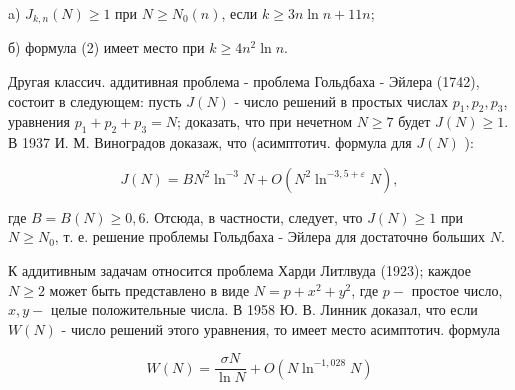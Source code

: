 \documentclass[10pt]{article}
\begin{document}
a) $J_{k, n}(N) \geqslant 1$ при $N \geqslant N_{0}(n)$, если $k \geqslant 3 n \ln n+11 n$;



б) формула (2) имеет место при $k \geqslant 4 n^{2} \ln n$.



Другая классич. аддитивная проблема - проблема Гольдбаха - Эйлера (1742), состоит в следующем: пусть $J(N)$ - число решений в простых числах $p_{1}, p_{2}, p_{3}$, уравнения $p_{1}+p_{2}+p_{3}=N$; доказать, что при нечетном $N \geqslant 7$ будет $J(N) \geqslant 1$. В 1937 И. М. Виноградов доказаж, что (асимптотич. формула для $J(N)$ ):



\[

J(N)=B N^{2} \ln ^{-3} N+O\left(N^{2} \ln ^{-3,5+\varepsilon} N\right),

\]



где $B=B(N) \geqslant 0,6$. Отсюда, в частности, следует, что $J(N) \geqslant 1$ при $N \geqslant N_{0}$, т. е. решение проблемы Гольдбаха - Эйлера для достаточнө больших $N$.



К аддитивным задачам относится проблема Харди Литлвуда (1923); каждое $N \geqslant 2$ может быть представлено в виде $N=p+x^{2}+y^{2}$, где $p-$ простое число, $x, y-$ целые положительные числа. В 1958 Ю. В. Линник доказал, что если $W(N)$ - число решений этого уравнения, то имеет место асимптотич. формула



\[

W(N)=\frac{\sigma N}{\ln N}+O\left(N \ln ^{-1,028} N\right)

\]
\end{document}
